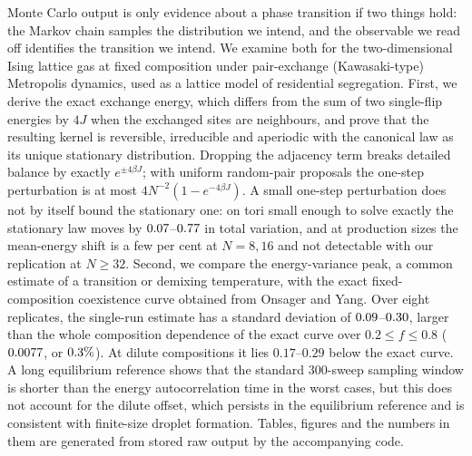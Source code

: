 Monte Carlo output is only evidence about a phase transition if two things hold: the Markov chain samples the distribution we intend, and the observable we read off identifies the transition we intend. We examine both for the two-dimensional Ising lattice gas at fixed composition under pair-exchange (Kawasaki-type) Metropolis dynamics, used as a lattice model of residential segregation. First, we derive the exact exchange energy, which differs from the sum of two single-flip energies by $4J$ when the exchanged sites are neighbours, and prove that the resulting kernel is reversible, irreducible and aperiodic with the canonical law as its unique stationary distribution. Dropping the adjacency term breaks detailed balance by exactly $e^{\pm4\beta J}$; with uniform random-pair proposals the one-step perturbation is at most $4N^{-2}(1-e^{-4\beta J})$. A small one-step perturbation does not by itself bound the stationary one: on tori small enough to solve exactly the stationary law moves by $0.07$--$0.77$ in total variation, and at production sizes the mean-energy shift is a few per cent at $N=8,16$ and not detectable with our replication at $N\ge32$. Second, we compare the energy-variance peak, a common estimate of a transition or demixing temperature, with the exact fixed-composition coexistence curve obtained from Onsager and Yang. Over eight replicates, the single-run estimate has a standard deviation of $0.09$--$0.30$, larger than the whole composition dependence of the exact curve over $0.2\le f\le0.8$ ($0.0077$, or $0.3\%$). At dilute compositions it lies $0.17$--$0.29$ below the exact curve. A long equilibrium reference shows that the standard 300-sweep sampling window is shorter than the energy autocorrelation time in the worst cases, but this does not account for the dilute offset, which persists in the equilibrium reference and is consistent with finite-size droplet formation. Tables, figures and the numbers in them are generated from stored raw output by the accompanying code.
